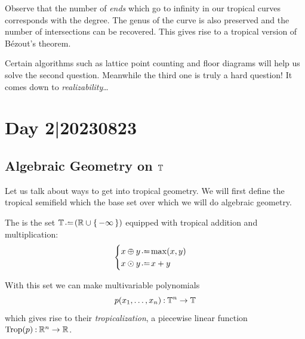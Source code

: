 \documentclass[12pt]{memoir}
\DeclareMathOperator{\Trop}{Trop}
\begin{document}
Observe that the number of \emph{ends} which go to infinity in our tropical curves corresponds with the degree. The genus of the curve is also preserved and the number of intersections can be recovered. This gives rise to a tropical version of Bézout's theorem.\par 
Certain algorithms such as lattice point counting and floor diagrams will help us solve the second question. Meanwhile the third one is truly a hard question! It comes down to \emph{realizability}\dots

\section{Day 2|20230823}
\subsection{Algebraic Geometry on $\mathbb{T}$}
Let us talk about ways to get into tropical geometry. We will first define the tropical semifield which the base set over which we will do algebraic geometry.

\begin{Def}
    The  is the set $\bT\defeq(\bR\cup\set{-\infty})$ equipped with tropical addition and multiplication:
    $$
    \begin{cases}
        x\oplus y\defeq\max(x,y)\\
        x\odot y\defeq x+y
    \end{cases}
    $$
\end{Def}

With this set we can make multivariable polynomials 
$$p(x_1,\dots,x_n)\mathbin{:}\mathbb{T}^n\to\mathbb{T}$$
which gives rise to their \emph{tropicalization}, a piecewise linear function $\Trop(p)\:\bR^n\to\bR$.
\end{document}
